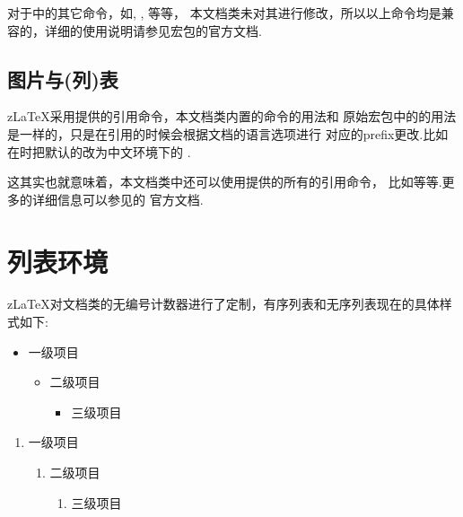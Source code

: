 对于中的其它命令，如\cmd{\Cref}, \cmd{\crefrange}, \cmd{\Crefrange}等等，
本文档类未对其进行修改，所以以上命令均是兼容的，详细的使用说明请参见宏包的官方文档.

\subsection{图片与(列)表}
z\LaTeX{}采用提供的引用命令，本文档类内置的\cmd{\cref}命令的用法和
原始宏包中的\cmd{\cref}\index{\cmd{\cref}}的用法是一样的，只是在引用的时候会根据文档的语言选项进行
对应的prefix更改.比如在时把默认的改为中文环境下的 .

这其实也就意味着，本文档类中还可以使用提供的所有的引用命令，
比如\cmd{\Cref, \crefrange, \Crefrange}等等.更多的详细信息可以参见的
官方文档.

\section{列表环境}
z\LaTeX{}对文档类的无编号计数器进行了定制，有序列表和无序列表现在的具体样式如下:

\begin{multicols}{2}
    \begin{itemize}
        \item 一级项目
        \begin{itemize}
            \item 二级项目
            \begin{itemize}
                \item 三级项目
            \end{itemize}
        \end{itemize}
    \end{itemize}
    
    \begin{enumerate}
        \item 一级项目
        \begin{enumerate}
            \item 二级项目
            \begin{enumerate}
                \item 三级项目
            \end{enumerate}
        \end{enumerate}
    \end{enumerate}
\end{multicols}


